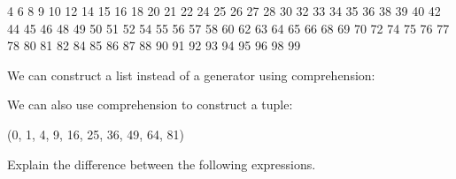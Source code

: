 \documentclass[letterpaper,10pt,english]{sphinxmanual}
\begin{document}
\begin{sphinxVerbatim}[commandchars=\\\{\}]
4 6 8 9 10 12 14 15 16 18 20 21 22 24 25 26 27 28 30 32 33 34 35 36 38 39 40 42 44 45 46 48 49 50 51 52 54 55 56 57 58 60 62 63 64 65 66 68 69 70 72 74 75 76 77 78 80 81 82 84 85 86 87 88 90 91 92 93 94 95 96 98 99
\end{sphinxVerbatim}

We can construct a list instead of a generator using comprehension:

\begin{sphinxVerbatim}[commandchars=\\\{\}]
      
\PYG{p}{[}    \PYG{p}{]}      
\end{sphinxVerbatim}

\begin{sphinxVerbatim}[commandchars=\\\{\}]
[0, 1, 4, 9, 16, 25, 36, 49, 64, 81]
[0, 1, 4, 9, 16, 25, 36, 49, 64, 81]
\end{sphinxVerbatim}

We can also use comprehension to construct a tuple:

\begin{sphinxVerbatim}[commandchars=\\\{\}]
     
\end{sphinxVerbatim}

\begin{sphinxVerbatim}[commandchars=\\\{\}]
(0, 1, 4, 9, 16, 25, 36, 49, 64, 81)
\end{sphinxVerbatim}

 Explain the difference between the following expressions.

\begin{sphinxVerbatim}[commandchars=\\\{\}]
    
           
\end{sphinxVerbatim}
\end{document}

